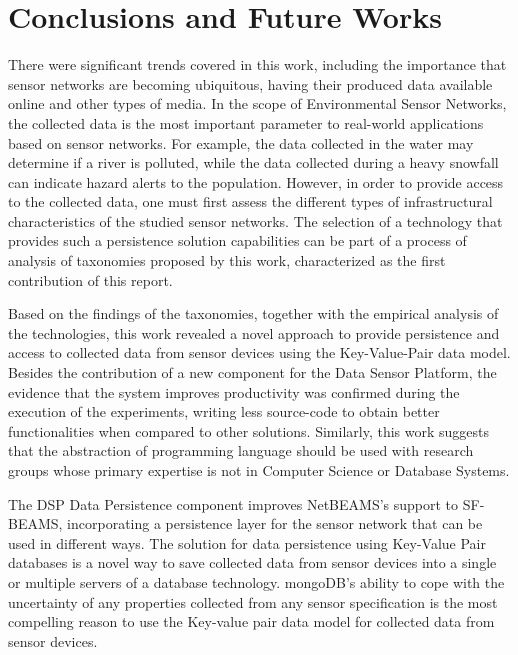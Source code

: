 

\chapter{Conclusions and Future Works}

There were significant trends covered in this work, including the importance
that sensor networks are becoming ubiquitous, having their produced data
available online and other types of media. In the scope of Environmental Sensor
Networks, the collected data is the most important parameter to real-world
applications based on sensor networks. For example, the data collected in the
water may determine if a river is polluted, while the data collected during a
heavy snowfall can indicate hazard alerts to the population. However, in order
to provide access to the collected data, one must first assess the different types of
infrastructural characteristics of the studied sensor networks. The selection
of a technology that provides such a persistence solution capabilities can be
part of a process of analysis of taxonomies proposed by this work,
characterized as the first contribution of this report.

Based on the findings of the taxonomies, together with the empirical analysis
of the technologies, this work revealed a novel approach to provide
persistence and access to collected data from sensor devices using the
Key-Value-Pair data model. Besides the contribution of a new component for the
Data Sensor Platform, the evidence that the system improves productivity was
confirmed during the execution of the experiments, writing less source-code to
obtain better functionalities when compared to other solutions. Similarly,
this work suggests that the abstraction of programming language should be
used with research groups whose primary expertise is not in Computer Science
or Database Systems.

The DSP Data Persistence component improves NetBEAMS's support to SF-BEAMS,
incorporating a persistence layer for the sensor network that can be used in
different ways. The solution for data persistence using Key-Value Pair
databases is a novel way to save collected data from sensor devices into a
single or multiple servers of a database technology. mongoDB's ability to cope
with the uncertainty of any properties collected from any sensor specification
is the most compelling reason to use the Key-value pair data model for collected
data from sensor devices.

